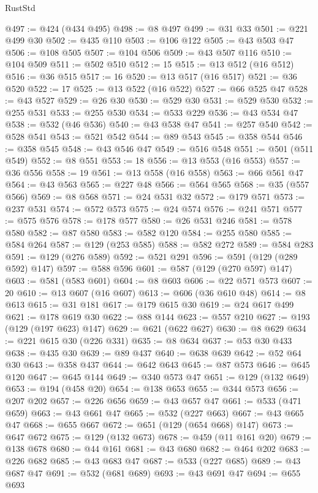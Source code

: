 \begin{lexlean}{RustStd}
\begin{coremodule}
{\begin{coremodule}
{{{{{{{{{{{{{{{{{{{{{{{{{{@497 := @424 (@434 @495)
@498 := @8 @497
@499 := @31 @33
@501 := @221 @499 @30
@502 := @435 @110
@503 := @106 @122
@505 := @43 @503 @47
@506 := @108 @505
@507 := @104 @506
@509 := @43 @507 @116
@510 := @104 @509
@511 := @502 @510
@512 := 15
@515 := @13 @512 (@16 @512)
@516 := @36 @515
@517 := 16
@520 := @13 @517 (@16 @517)
@521 := @36 @520
@522 := 17
@525 := @13 @522 (@16 @522)
@527 := @66 @525 @47
@528 := @43 @527
@529 := @26 @30
@530 := @529 @30
@531 := @529 @530
@532 := @255 @531
@533 := @255 @530
@534 := @533 @229
@536 := @43 @534 @47
@538 := @532 (@46 @536)
@540 := @43 @538 @47
@541 := @257 @540
@542 := @528 @541
@543 := @521 @542
@544 := @89 @543
@545 := @358 @544
@546 := @358 @545
@548 := @43 @546 @47
@549 := @516 @548
@551 := @501 (@511 @549)
@552 := @8 @551
@553 := 18
@556 := @13 @553 (@16 @553)
@557 := @36 @556
@558 := 19
@561 := @13 @558 (@16 @558)
@563 := @66 @561 @47
@564 := @43 @563
@565 := @227 @48
@566 := @564 @565
@568 := @35 (@557 @566)
@569 := @8 @568
@571 := @24 @531 @32
@572 := @179 @571
@573 := @237 @531
@574 := @572 @573
@575 := @24 @574
@576 := @241 @571
@577 := @575 @576
@578 := @178 @577
@580 := @26 @531 @246
@581 := @578 @580
@582 := @87 @580
@583 := @582 @120
@584 := @255 @580
@585 := @584 @264
@587 := @129 (@253 @585)
@588 := @582 @272
@589 := @584 @283
@591 := @129 (@276 @589)
@592 := @521 @291
@596 := @591 (@129 (@289 @592) @147)
@597 := @588 @596
@601 := @587 (@129 (@270 @597) @147)
@603 := @581 (@583 @601)
@604 := @8 @603
@606 := @22 @571 @573
@607 := 20
@610 := @13 @607 (@16 @607)
@613 := @606 (@36 @610 @48)
@614 := @8 @613
@615 := @31 @181
@617 := @179 @615 @30
@619 := @24 @617 @499
@621 := @178 @619 @30
@622 := @88 @144
@623 := @557 @210
@627 := @193 (@129 (@197 @623) @147)
@629 := @621 (@622 @627)
@630 := @8 @629
@634 := @221 @615 @30 (@226 @331)
@635 := @8 @634
@637 := @53 @30 @433
@638 := @435 @30
@639 := @89 @437
@640 := @638 @639
@642 := @52 @64 @30
@643 := @358 @437
@644 := @642 @643
@645 := @87 @573
@646 := @645 @120
@647 := @645 @144
@649 := @340 @573 @47
@651 := @129 (@132 @649)
@653 := @194 (@458 @20)
@654 := @138 @653
@655 := @344 @573
@656 := @207 @202
@657 := @226 @656
@659 := @43 @657 @47
@661 := @533 (@471 @659)
@663 := @43 @661 @47
@665 := @532 (@227 @663)
@667 := @43 @665 @47
@668 := @655 @667
@672 := @651 (@129 (@654 @668) @147)
@673 := @647 @672
@675 := @129 (@132 @673)
@678 := @459 (@11 @161 @20)
@679 := @138 @678
@680 := @44 @161
@681 := @43 @680
@682 := @464 @202
@683 := @226 @682
@685 := @43 @683 @47
@687 := @533 (@227 @685)
@689 := @43 @687 @47
@691 := @532 (@681 @689)
@693 := @43 @691 @47
@694 := @655 @693
}}}}}}}}}}}}}}}}}}}}}}}}}}
\end{coremodule}}
\end{coremodule}
\end{lexlean}
